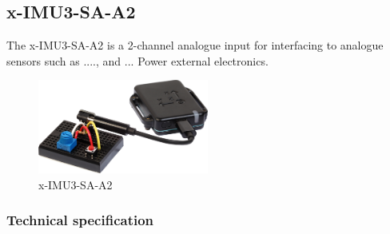 \newcommand{\specificationTable}[4]{
    \customTable
    {l c c}
    {Characteristic & Value & Notes}
    {
        #1
    }
    {#2}
    {#3}
    \textbf{Notes}
    \begin{enumerate}[nolistsep]
        #4
    \end{enumerate}
}

\newcommand{\messageExample}[1]{
    \begin{table}[H]
        \def\arraystretch{1.5}
        \begin{tabular}{l l}
            \textbf{Example:} & \texttt{#1\textbackslash n}
        \end{tabular}
    \end{table}
}

\subsection{x-IMU3-SA-A2}

The x-IMU3-SA-A2 is a 2-channel analogue input for interfacing to analogue sensors such as ...., and ...
%
Power external electronics.
%

\begin{figure}[H]
    \centering
    \includegraphics[width=0.5\textwidth]{Images/saA2.png}
    \caption{x-IMU3-SA-A2}
    \label{fig:ximu3SAA2}
\end{figure}

\subsubsection{Technical specification}

